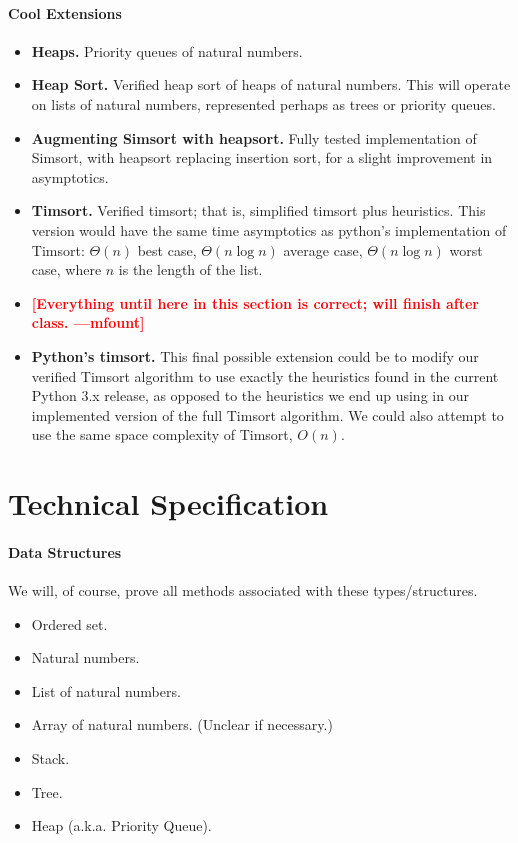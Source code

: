 \documentclass{article}
\newcommand{\todo}[1]{\textcolor{red}{\textbf{\textsf{[#1]}}}}
\begin{document}
\paragraph{Cool Extensions}
\begin{itemize}
  \item \textbf{Heaps.}
    Priority queues of natural numbers.
  \item \textbf{Heap Sort.}
    Verified heap sort of heaps of natural numbers.
    This will operate on lists of natural numbers, represented perhaps
    as trees or priority queues.
  \item \textbf{Augmenting Simsort with heapsort.}
    Fully tested implementation of Simsort, with heapsort replacing
    insertion sort, for a slight improvement in asymptotics.

  \item \textbf{Timsort.}
    Verified timsort; that is, simplified timsort plus heuristics.
    This version would have the same time asymptotics as python's
    implementation of Timsort:
    $\Theta(n)$ best case,
    $\Theta(n \log n)$ average case,
    $\Theta(n \log n)$ worst case,
    where $n$ is the length of the list.

  \item \todo{Everything until here in this section is correct;
    will finish after class. ---mfount}

  \item \textbf{Python's timsort.}
    This final possible extension could be to modify our verified Timsort
    algorithm to use exactly the heuristics found in the current Python 3.x
    release, as opposed to the heuristics we end up using in our implemented
    version of the full Timsort algorithm.
    We could also attempt to use the same space complexity of
    Timsort, $O(n)$.
\end{itemize}


\section{Technical Specification}
\paragraph{Data Structures}
We will, of course, prove all methods associated with these types/structures.

\begin{itemize}
  \item Ordered set.
  \item Natural numbers.
  \item List of natural numbers.
  \item Array of natural numbers.
    (Unclear if necessary.)
  \item Stack.
  \item Tree.
  \item Heap (a.k.a. Priority Queue).
\end{itemize}
\end{document}
